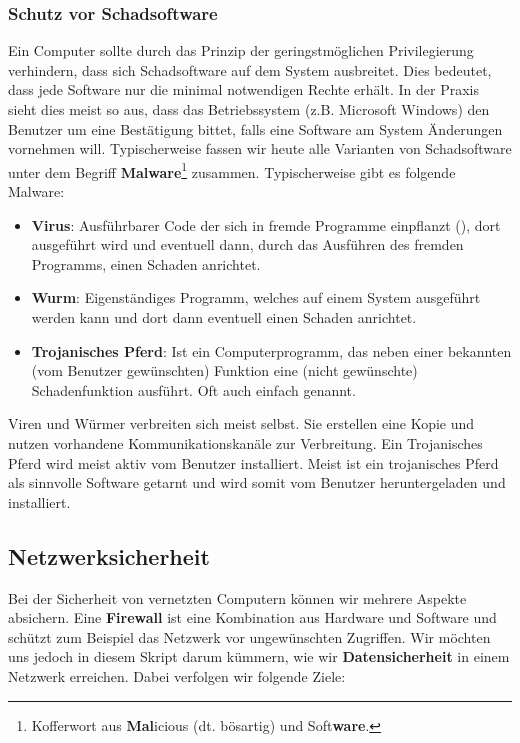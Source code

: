 \subsubsection{Schutz vor Schadsoftware}

Ein Computer sollte durch das Prinzip der geringstmöglichen Privilegierung verhindern, dass sich Schadsoftware auf dem System ausbreitet. Dies bedeutet, dass jede Software nur die minimal notwendigen Rechte erhält. In der Praxis sieht dies meist so aus, dass das Betriebssystem (z.B. Microsoft Windows) den Benutzer um eine Bestätigung bittet, falls eine Software am System Änderungen vornehmen will. Typischerweise fassen wir heute alle Varianten von Schadsoftware unter dem Begriff \textbf{Malware}\footnote{Kofferwort aus \textbf{Mal}icious (dt. bösartig) und Soft\textbf{ware}.} zusammen. Typischerweise gibt es folgende Malware:

\begin{itemize}
\item \textbf{Virus}: Ausführbarer Code der sich in fremde Programme einpflanzt (), dort ausgeführt wird und eventuell dann, durch das Ausführen des fremden Programms, einen Schaden anrichtet.
\item \textbf{Wurm}: Eigenständiges Programm, welches auf einem System ausgeführt werden kann und dort dann eventuell einen Schaden anrichtet.
\item \textbf{Trojanisches Pferd}: Ist ein Computerprogramm, das neben einer bekannten (vom Benutzer gewünschten) Funktion eine (nicht gewünschte) Schadenfunktion ausführt. Oft auch einfach  genannt.
\end{itemize}

Viren und Würmer verbreiten sich meist selbst. Sie erstellen eine Kopie und nutzen vorhandene Kommunikationskanäle zur Verbreitung. Ein Trojanisches Pferd wird meist aktiv vom Benutzer installiert. Meist ist ein trojanisches Pferd als sinnvolle Software getarnt und wird somit vom Benutzer heruntergeladen und installiert.

\subsection{Netzwerksicherheit}

Bei der Sicherheit von vernetzten Computern können wir mehrere Aspekte absichern. Eine \textbf{Firewall} ist eine Kombination aus Hardware und Software und schützt zum Beispiel das Netzwerk vor ungewünschten Zugriffen.  Wir möchten uns jedoch in diesem Skript darum kümmern, wie wir \textbf{Datensicherheit} in einem Netzwerk erreichen. Dabei verfolgen wir folgende Ziele:

